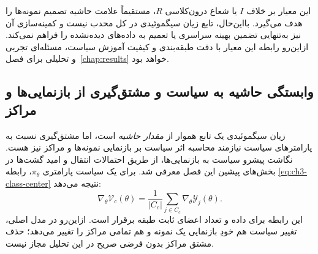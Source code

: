 این معیار بر خلاف $I$ یا شعاع درون‌کلاسی $R$، مستقیماً علامت حاشیه تصمیم نمونه‌ها را هدف می‌گیرد. بااین‌حال، تابع زیان سیگموئیدی در کل محدب نیست و کمینه‌سازی آن نیز به‌تنهایی تضمین بهینه سراسری یا تعمیم به داده‌های دیده‌نشده را فراهم نمی‌کند. ازاین‌رو رابطه این معیار با دقت طبقه‌بندی و کیفیت آموزش سیاست، مسئله‌ای تجربی و تحلیلی برای فصل~\ref{chap:results} خواهد بود.





\subsection{وابستگی حاشیه به سیاست و مشتق‌گیری از بازنمایی‌ها و مراکز}
\label{subsec:ch3-margin-policy-derivatives}
زیان سیگموئیدی یک تابع
هموار از \emph{مقدار حاشیه}
است، اما مشتق‌گیری نسبت به
پارامترهای سیاست نیازمند
محاسبه اثر سیاست بر
بازنمایی نمونه‌ها و مراکز
نیز هست. نگاشت پیشرو
سیاست به بازنمایی‌ها،
از طریق احتمالات انتقال
و امید گشت‌ها در بخش‌های
پیشین این فصل معرفی شد.
برای یک سیاست پارامتری
$\pi_\theta$، رابطه
\eqref{eq:ch3-class-center}
نتیجه می‌دهد:
\begin{equation}\label{eq:ch3-margin-center-policy-derivative}
\boxed{
\nabla_\theta\mathcal V_c(\theta)
=\frac1{|C_c|}\sum_{j\in C_c}
\nabla_\theta\mathscr Y_j(\theta).
}
\end{equation}
این رابطه برای داده و
تعداد اعضای ثابت طبقه برقرار است.
ازاین‌رو در مدل اصلی،
تغییر سیاست هم خودِ
بازنمایی یک نمونه و
هم تمامی مراکز را
تغییر می‌دهد؛ حذف مشتق
مراکز بدون فرضی صریح
در این تحلیل مجاز نیست.

